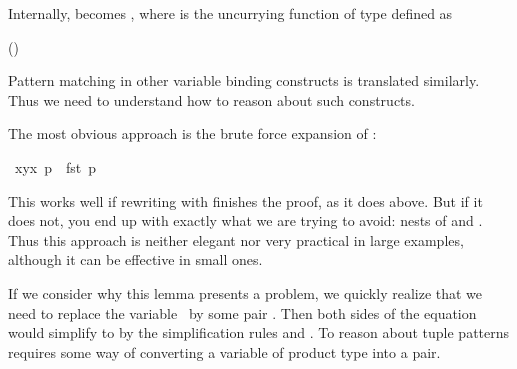 \begin{isabellebody}
\begin{isamarkuptext}
Internally,  becomes , where
 is the uncurrying function of type  defined as
\begin{center}
\hfill()
\end{center}
Pattern matching in
other variable binding constructs is translated similarly. Thus we need to
understand how to reason about such constructs.%
\end{isamarkuptext}%
\isamarkuptrue%
%
\isamarkuptrue%
%
\begin{isamarkuptext}%
The most obvious approach is the brute force expansion of :%
\end{isamarkuptext}%
\isamarkuptrue%
\ {\isachardoublequote}{\isacharparenleft}{\isasymlambda}{\isacharparenleft}x{\isacharcomma}y{\isacharparenright}{\isachardot}x{\isacharparenright}\ p\ {\isacharequal}\ fst\ p{\isachardoublequote}\isanewline
\isamarkupfalse%
\isamarkupfalse%
%
\begin{isamarkuptext}%
This works well if rewriting with  finishes the
proof, as it does above.  But if it does not, you end up with exactly what
we are trying to avoid: nests of  and . Thus this
approach is neither elegant nor very practical in large examples, although it
can be effective in small ones.

If we consider why this lemma presents a problem, 
we quickly realize that we need to replace the variable~ by some pair .  Then both sides of the
equation would simplify to  by the simplification rules
 and .  
To reason about tuple patterns requires some way of
converting a variable of product type into a pair.


\end{isamarkuptext}
\end{isabellebody}
